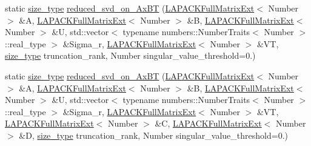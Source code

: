 \begin{DoxyCompactItemize}
\item 
static \hyperlink{classLAPACKFullMatrixExt_a5cf5f4a6104dc17029210b5ca52bf574}{size\+\_\+type} \hyperlink{classLAPACKFullMatrixExt_a56dbf804ab7f3ffb3ed3a09d5b4e5170}{reduced\+\_\+svd\+\_\+on\+\_\+\+Ax\+BT} (\hyperlink{classLAPACKFullMatrixExt}{L\+A\+P\+A\+C\+K\+Full\+Matrix\+Ext}$<$ Number $>$ \&A, \hyperlink{classLAPACKFullMatrixExt}{L\+A\+P\+A\+C\+K\+Full\+Matrix\+Ext}$<$ Number $>$ \&B, \hyperlink{classLAPACKFullMatrixExt}{L\+A\+P\+A\+C\+K\+Full\+Matrix\+Ext}$<$ Number $>$ \&U, std\+::vector$<$ typename numbers\+::\+Number\+Traits$<$ Number $>$\+::real\+\_\+type $>$ \&Sigma\+\_\+r, \hyperlink{classLAPACKFullMatrixExt}{L\+A\+P\+A\+C\+K\+Full\+Matrix\+Ext}$<$ Number $>$ \&VT, \hyperlink{classLAPACKFullMatrixExt_a5cf5f4a6104dc17029210b5ca52bf574}{size\+\_\+type} truncation\+\_\+rank, Number singular\+\_\+value\+\_\+threshold=0.)
\item 
static \hyperlink{classLAPACKFullMatrixExt_a5cf5f4a6104dc17029210b5ca52bf574}{size\+\_\+type} \hyperlink{classLAPACKFullMatrixExt_a4107b8340a75683fd59024e20631ce10}{reduced\+\_\+svd\+\_\+on\+\_\+\+Ax\+BT} (\hyperlink{classLAPACKFullMatrixExt}{L\+A\+P\+A\+C\+K\+Full\+Matrix\+Ext}$<$ Number $>$ \&A, \hyperlink{classLAPACKFullMatrixExt}{L\+A\+P\+A\+C\+K\+Full\+Matrix\+Ext}$<$ Number $>$ \&B, \hyperlink{classLAPACKFullMatrixExt}{L\+A\+P\+A\+C\+K\+Full\+Matrix\+Ext}$<$ Number $>$ \&U, std\+::vector$<$ typename numbers\+::\+Number\+Traits$<$ Number $>$\+::real\+\_\+type $>$ \&Sigma\+\_\+r, \hyperlink{classLAPACKFullMatrixExt}{L\+A\+P\+A\+C\+K\+Full\+Matrix\+Ext}$<$ Number $>$ \&VT, \hyperlink{classLAPACKFullMatrixExt}{L\+A\+P\+A\+C\+K\+Full\+Matrix\+Ext}$<$ Number $>$ \&C, \hyperlink{classLAPACKFullMatrixExt}{L\+A\+P\+A\+C\+K\+Full\+Matrix\+Ext}$<$ Number $>$ \&D, \hyperlink{classLAPACKFullMatrixExt_a5cf5f4a6104dc17029210b5ca52bf574}{size\+\_\+type} truncation\+\_\+rank, Number singular\+\_\+value\+\_\+threshold=0.)
\end{DoxyCompactItemize}

